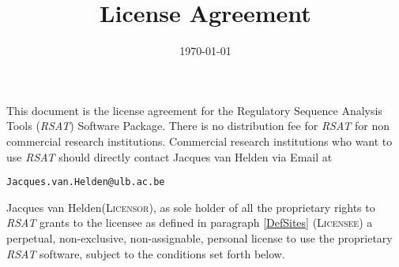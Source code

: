 \documentclass[12pt]{article}
\title{\RSAT License Agreement}
\author{\vspace*{-1cm}}
\date{\vspace*{-1cm}\today}
\makeatletter
\newcommand{\RSAT}[0]{\emph{RSAT}\xspace}
\newcommand{\Licensorname}[0]{Jacques van Helden\xspace}
\newcommand{\Licensor}[0]{\textsc{Licensor}\xspace}
\newcommand{\Licensee}[0]{\textsc{Licensee}\xspace}
\newcommand{\JvHemail}[0]{\texttt{\small Jacques.van.Helden@ulb.ac.be}\xspace}
\makeatother
\begin{document}
\maketitle

This document is the license agreement for the Regulatory Sequence
Analysis Tools (\RSAT) Software Package.  There is no distribution fee
for \RSAT for non commercial research institutions. Commercial
research institutions who want to use \RSAT should directly contact
Jacques van Helden via Email at
\begin{center}
\JvHemail
\end{center}

\Licensorname (\Licensor), as sole holder of all the proprietary
rights to \RSAT grants to the licensee as defined in paragraph
\ref{DefSites} (\Licensee) a perpetual, non-exclusive, non-assignable,
personal license to use the proprietary \RSAT software, subject to the
conditions set forth below.
\end{document}
